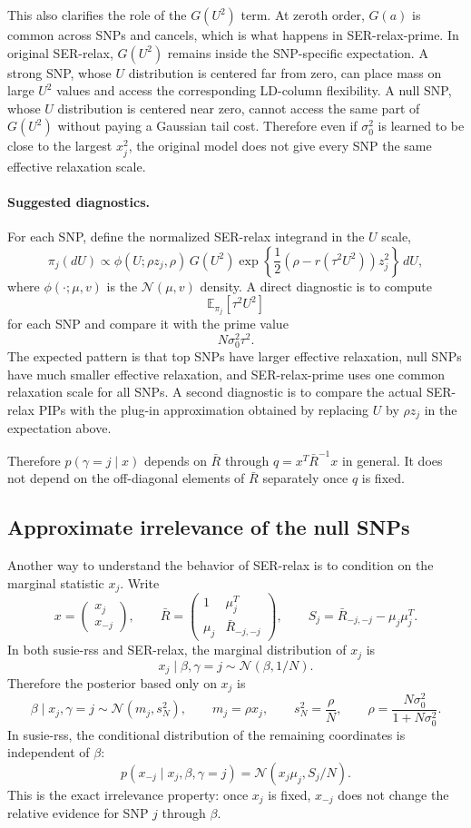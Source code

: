 \documentclass[11pt]{article}
\newcommand{\E}{\mathbb E}
\newcommand{\Normal}{\mathcal N}
\begin{document}
This also clarifies the role of the $G(U^2)$ term. At zeroth order,
$G(a)$ is common across SNPs and cancels, which is what happens in
SER-relax-prime. In original SER-relax, $G(U^2)$ remains inside the
SNP-specific expectation. A strong SNP, whose $U$ distribution is centered far
from zero, can place mass on large $U^2$ values and access the corresponding
LD-column flexibility. A null SNP, whose $U$ distribution is centered near
zero, cannot access the same part of $G(U^2)$ without paying a Gaussian tail
cost. Therefore even if $\sigma_0^2$ is learned to be close to the largest
$x_j^2$, the original model does not give every SNP the same effective
relaxation scale.

\paragraph{Suggested diagnostics.}
For each SNP, define the normalized SER-relax integrand in the $U$ scale,
\[
\pi_j(dU)
\propto
\phi(U;\rho z_j,\rho)\,
G(U^2)
\exp\left\{
\frac{1}{2}\left(\rho-r(\tau^2U^2)\right)z_j^2
\right\}\,dU,
\]
where $\phi(\cdot;\mu,v)$ is the $\Normal(\mu,v)$ density. A direct diagnostic
is to compute
\[
\E_{\pi_j}[\tau^2U^2]
\]
for each SNP and compare it with the prime value
\[
N\sigma_0^2\tau^2.
\]
The expected pattern is that top SNPs have larger effective relaxation, null
SNPs have much smaller effective relaxation, and SER-relax-prime uses one
common relaxation scale for all SNPs. A second diagnostic is to compare the
actual SER-relax PIPs with the plug-in approximation obtained by replacing
$U$ by $\rho z_j$ in the expectation above.

Therefore $p(\gamma=j\mid x)$ depends on $\bar{R}$ through $q=x^T\bar{R}^{-1}x$ in general. It does not depend on the off-diagonal elements of $\bar{R}$ separately once $q$ is fixed.


\subsection{Approximate irrelevance of the null SNPs}

Another way to understand the behavior of SER-relax is to condition on the
marginal statistic $x_j$. Write
\[
x=\begin{pmatrix}x_j\\x_{-j}\end{pmatrix},
\qquad
\bar R
=
\begin{pmatrix}
1 & \mu_j^T\\
\mu_j & \bar R_{-j,-j}
\end{pmatrix},
\qquad
S_j=\bar R_{-j,-j}-\mu_j\mu_j^T.
\]
In both susie-rss and SER-relax, the marginal distribution of $x_j$ is
\[
x_j\mid \beta,\gamma=j \sim \Normal(\beta,1/N).
\]
Therefore the posterior based only on $x_j$ is
\[
\beta\mid x_j,\gamma=j
\sim
\Normal(m_j,s_N^2),
\qquad
m_j=\rho x_j,\qquad
s_N^2=\frac{\rho}{N},
\qquad
\rho=\frac{N\sigma_0^2}{1+N\sigma_0^2}.
\]
In susie-rss, the conditional distribution of the remaining coordinates is
independent of $\beta$:
\[
p(x_{-j}\mid x_j,\beta,\gamma=j)
=
\Normal(x_j\mu_j,S_j/N).
\]
This is the exact irrelevance property: once $x_j$ is fixed, $x_{-j}$ does not
change the relative evidence for SNP $j$ through $\beta$.
\end{document}
